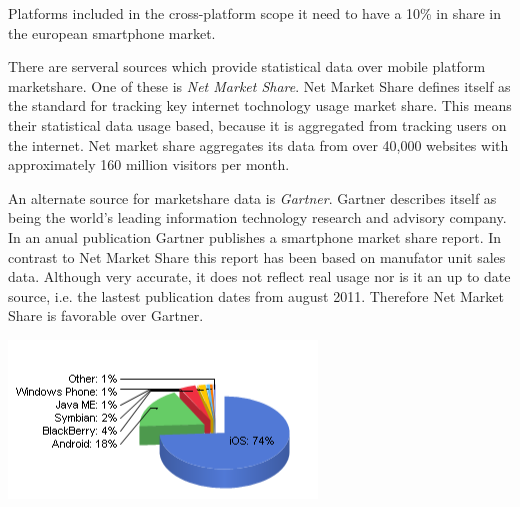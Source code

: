 Platforms included in the cross-platform scope it need to have a 10\% in share in the european smartphone market. 

There are serveral sources which provide statistical data over mobile platform marketshare. One of these is \emph{Net Market Share}. Net Market Share defines itself as the standard for tracking key internet tochnology usage market share. This means their statistical data usage based, because it is aggregated from tracking users on the internet. Net market share aggregates its data from over 40,000 websites with approximately 160 million visitors per month.\cite{NetApplications2012}


An alternate source for marketshare data is \emph{Gartner}. Gartner describes itself as being the world's leading information technology research and advisory company.\cite{Gartner2012} In an anual publication Gartner publishes a smartphone market share report. In contrast to Net Market Share this report has been based on manufator unit sales data. Although very accurate, it does not reflect real usage nor is it an up to date source, i.e. the lastest publication dates from august 2011.\cite{Pettey2011} Therefore Net Market Share is favorable over Gartner.


\begin{centering}
\includegraphics[scale=0.5]{images/netmarketshare_march2012.png}\\
\end{centering}


